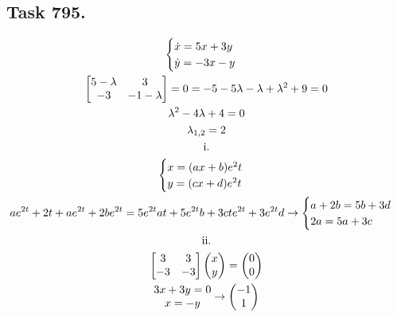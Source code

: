 \documentclass{article}
\newcommand{\RN}[1]{%
  \textup{\uppercase\expandafter{\romannumeral#1}}%
}
\begin{document}
\subsection*{Task 795.}

\addtolength{\jot}{1pt}
\begin{fleqn}[1\parindent]
  \begin{gather*}
    \begin{cases}
      \dot{x}=5x+3y\\ 
      \dot{y}=-3x-y
    \end{cases} \\ 
    \begin{bmatrix}
      5-\lambda & 3 \\ -3 & -1-\lambda
    \end{bmatrix}
    = 0 = -5-5\lambda-\lambda+\lambda^2+9=0 \\ 
    \lambda^2-4\lambda+4 = 0 \\ 
    \lambda_{1,2}=2 \\ 
    \RN{1}.\\ 
    \begin{cases}
      x=(ax+b)e^2t \\ 
      y=(cx+d)e^2t 
    \end{cases} \\ 
    ae^{2t}+2t+ae^{2t}+2be^{2t} = 5e^{2t}at+5e^{2t}b+3cte^{2t}+3e^{2t}d \rightarrow 
    \begin{cases}
      a+2b=5b+3d \\ 
      2a=5a+3c
    \end{cases} \\ 
    \RN{2}. \\
    \begin{bmatrix}
      3&3\\-3&-3
    \end{bmatrix}
    \begin{pmatrix}
      x\\y
    \end{pmatrix}
    =
    \begin{pmatrix}
      0\\0
    \end{pmatrix}\\ 
    \begin{matrix}
      3x+3y=0\\ 
      x=-y
    \end{matrix} \rightarrow 
    \begin{pmatrix}
      -1 \\ 1
    \end{pmatrix} \\ 

\end{gather*}
\end{fleqn}
\end{document}
